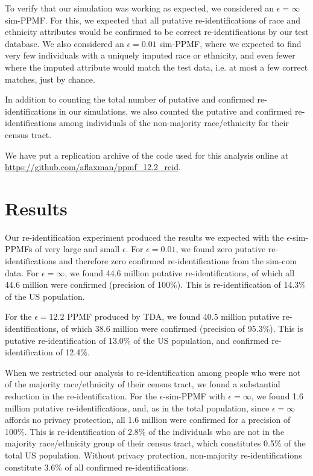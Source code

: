\documentclass{article}
\begin{document}
To verify that our simulation was working as expected, we considered an $\epsilon=\infty$ sim-PPMF. For this, we expected that all putative re-identifications of race and ethnicity attributes would be confirmed to be correct re-identifications by our test database. We also considered an $\epsilon=0.01$ sim-PPMF, where we expected to find very few individuals with a uniquely imputed race or ethnicity, and even fewer where the imputed attribute would match the test data, i.e. at most a few correct matches, just by chance.

In addition to counting the total number of putative and confirmed re-identifications in our simulations, we also counted the putative and confirmed re-identifications among individuals of the non-majority race/ethnicity for their census tract.

We have put a replication archive of the code used for this analysis online at \url{https://github.com/aflaxman/ppmf_12.2_reid}.

\section{Results}

Our re-identification experiment produced the results we expected with the $\epsilon$-sim-PPMFs of very large and small $\epsilon$.  For $\epsilon=0.01$, we found zero putative re-identifications and therefore zero confirmed re-identifications from the sim-com data.  For $\epsilon=\infty$, we found 44.6 million putative re-identifications, of which all 44.6 million were confirmed (precision of 100\%).  This is re-identification of 14.3\% of the US population.

For the $\epsilon=12.2$ PPMF produced by TDA, we found 40.5 million putative re-identifications, of which 38.6 million were confirmed (precision of 95.3\%). This is putative re-identification of 13.0\% of the US population, and confirmed re-identification of 12.4\%.

When we restricted our analysis to re-identification among people who were not of the majority race/ethnicity of their census tract, we found a substantial reduction in the re-identification.  For the $\epsilon$-sim-PPMF with $\epsilon=\infty$, we found 1.6 million putative re-identifications, and, as in the total population, since $\epsilon=\infty$ affords no privacy protection, all 1.6 million were confirmed for a precision of 100\%.  This is re-identification of 2.8\% of the individuals who are not in the majority race/ethnicity group of their census tract, which constitutes 0.5\% of the total US population.  Without privacy protection, non-majority re-identifications constitute 3.6\% of all confirmed re-identifications.
\end{document}
